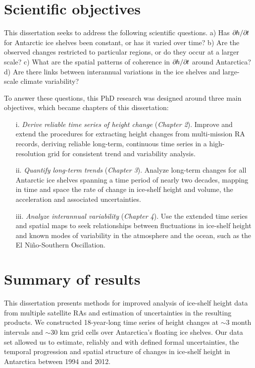 \section{Scientific objectives}

This dissertation seeks to address the following scientific questions.
a) Has $\partial\mkern-1.5mu h / \partial\mkern-1.5mu t$ for Antarctic ice shelves been constant,
or has it varied over time?
b) Are the observed changes restricted to particular regions, or do they
occur at a larger scale?
c) What are the spatial patterns of coherence in $\partial\mkern-1.5mu h / \partial\mkern-1.5mu t$
around Antarctica?
d) Are there links between interannual variations in the ice shelves and
large-scale climate variability?

To answer these questions, this PhD research was designed around three main objectives, which became chapters of this dissertation:

\begin{enumerate}
  \item[i.] {\it Derive reliable time series of height change} ({\sl Chapter 2}). Improve and
  extend the procedures for extracting height changes from multi-mission RA
  records, deriving reliable long-term, continuous time series in a
  high-resolution grid for consistent trend and variability analysis.
  \item[ii.] {\it Quantify long-term trends} ({\sl Chapter 3}). Analyze long-term changes for
  all Antarctic ice shelves spanning a time period of nearly two decades,
  mapping in time and space the rate of change in ice-shelf height and volume, the acceleration
  and associated uncertainties.
  \item[iii.] {\it Analyze interannual variability} ({\sl Chapter 4}). Use the
  extended time series and spatial maps to seek relationships between
  fluctuations in ice-shelf height and known modes of variability in the
  atmosphere and the ocean, such as the El Ni\~{n}o-Southern Oscillation.
\end{enumerate}

\clearpage

\section{Summary of results}

This dissertation presents methods for improved analysis of ice-shelf height data from multiple satellite RAs and estimation of uncertainties in the resulting products. We constructed 18-year-long time series of height changes at $\sim$3 month intervals and $\sim$30 km grid cells over Antarctica's floating ice shelves. Our data set allowed us to estimate, reliably and with defined formal uncertainties, the temporal progression and spatial structure of changes in ice-shelf height in Antarctica between 1994 and 2012.

